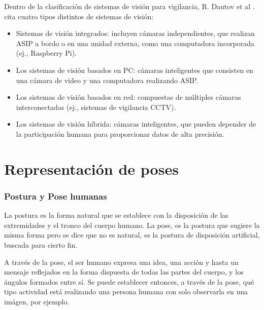\documentclass[a4paper,12pt,twoside]{article}
\begin{document}
Dentro de la clasificación de sistemas de visión para vigilancia, R. Dautov et al \cite{dautov}. cita cuatro tipos distintos de sistemas de visión:
\begin{itemize}
	\item Sistemas de visión integrados: incluyen cámaras independientes, que realizan ASIP a bordo o en una unidad externa, como una computadora incorporada (ej., Raspberry Pi).\\	
	\item Los sistemas de visión basados en PC: cámaras inteligentes que consisten en una cámara de video y una computadora  realizando ASIP.\\	
	\item Los sistemas de visión basados en red: compuestas de múltiples cámaras interconectadas (ej., sistemas de vigilancia CCTV).\\	
	\item Los sistemas de visión híbrida: cámaras inteligentes, que pueden depender de la participación humana para proporcionar datos de alta precisión.\\	
\end{itemize}

\newpage
\part{Representación de poses}

\section{Postura y Pose humanas}

La postura es la forma natural que se establece con la disposición de las extremidades y el tronco del cuerpo humano. La pose, es la postura que sugiere la misma forma pero se dice que no es natural, es la postura de disposición artificial, buscada para cierto fin. \par

A través de la pose, el ser humano expresa una idea, una acción y hasta un mensaje reflejados en la forma dispuesta de todas las partes del cuerpo, y los ángulos formados entre sí. Se puede establecer entonces, a través de la pose, qué tipo actividad está realizando una persona humana con solo observarla en una imágen, por ejemplo. \par
\end{document}
